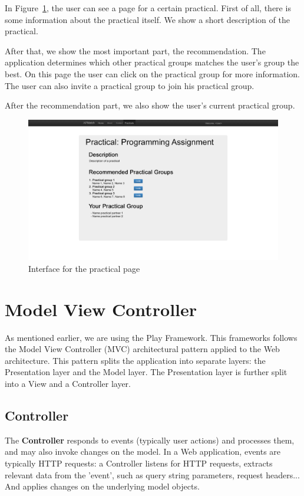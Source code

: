 In Figure~\ref{mockup_practical}, the user can see a page for a certain practical.
First of all, there is some information about the practical itself.
We show a short description of the practical.

After that, we show the most important part, the recommendation.
The application determines which other practical groups matches the user's group the best.
On this page the user can click on the practical group for more information.
The user can also invite a practical group to join his practical group.

After the recommendation part, we also show the user's current practical group.

\begin{figure}[H]
    \centering
    \captionsetup{justification=centering}
    \includegraphics[width=\textwidth, frame]{images/mockup_practical}
    \caption{Interface for the practical page}
    \label{mockup_practical}
\end{figure}

\section{Model View Controller}
\label{sec:mvc}
As mentioned earlier, we are using the Play Framework. 
This frameworks follows the Model View Controller (MVC) architectural pattern applied to the Web architecture\cite{playframework_mvc}.
This pattern splits the application into separate layers: the Presentation layer and the Model layer. 
The Presentation layer is further split into a View and a Controller layer.

\subsection{Controller}
The \textbf{Controller} responds to events (typically user actions) and processes them, and may also invoke changes on the model.
In a Web application, events are typically HTTP requests: a Controller listens for HTTP requests, extracts relevant data from the 'event', such as query string parameters, request headers... 
And applies changes on the underlying model objects.

